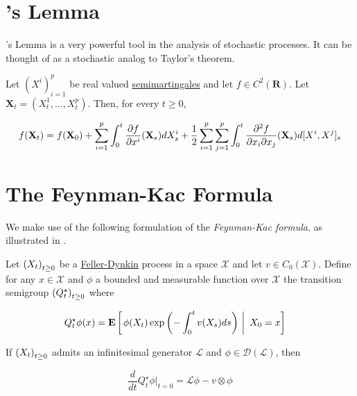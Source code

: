 \section{\Ito's Lemma}
\Ito's Lemma is a very powerful tool in the analysis of stochastic
processes. It can be thought of as a stochastic analog to Taylor's theorem.

\begin{theorem}\label{app:ito}
  Let $(X^i)_{i=1}^p$ be real valued
  \hyperref[def:semimartingale]{semimartingales} and let $f\in
  C^2(\mathbf{R})$. Let $\mathbf{X}_t = (X_t^1,\dots,X_t^p)$. Then, for every $t\geq 0$,

  \begin{equation}
    \begin{aligned}
    \label{eq:ito}
    f(\mathbf{X}_t) = f(\mathbf{X}_0) +
    \sum_{i=1}^p\int_0^t\partialderiv{f}{x^i}(\mathbf{X}_s)dX_s^i +
    \frac{1}{2}\sum_{i=1}^p\sum_{j=1}^p\int_0^t\frac{\partial^2f}{\partial
      x_i\partial x_j}(\mathbf{X}_s)d[X^i, X^j]_s
    \end{aligned}
  \end{equation}
\end{theorem}

\section{The Feynman-Kac Formula}\label{app:feynman-kac}
We make use of the following formulation of the \emph{Feynman-Kac
  formula}, as illustrated in \citet[Exercise 6.26]{le2016brownian}.

\begin{theorem}\label{thm:feynman-kac}
  Let $\indexedabove{t}{X}$ be a
  \hyperref[def:fd]{Feller-Dynkin} process in a space $\mathcal{X}$
  and let $v\in C_0(\mathcal{X})$. Define for any $x\in\mathcal{X}$
  and $\phi$ a bounded and measurable function over $\mathcal{X}$ the
  transition semigroup $\indexedabove{t}{Q^\star}$ where

  \begin{align*}
    Q_t^\star\phi(x) &= \ConditionExpect{\phi(X_t)\exp\left(-\int_0^tv(X_s)ds\right)}{X_0=x}
  \end{align*}

  If $\indexedabove{t}{X}$ admits an infinitesimal generator
  $\mathscr{L}$ and $\phi\in\mathcal{D}({\mathscr{L}})$, then

  \begin{equation}
    \label{eq:feynman-kac:generator}
    \frac{d}{dt}Q_t^\star\phi\rvert_{t=0} = \mathscr{L}\phi - v\otimes\phi
  \end{equation}
\end{theorem}

